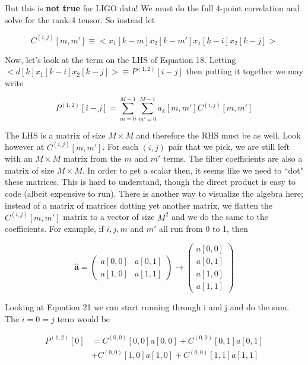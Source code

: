 \documentclass{article}
\begin{document}
But this is \textbf{not true} for LIGO data! We must do the full 4-point correlation
and solve for the rank-4 tensor. So instead let

\begin{equation}
     C^{(i,j)}[m,m'] \equiv \bigg<x_1[k-m]x_2[k-m'] x_1[k-i]x_2[k-j]\bigg> \nonumber
\end{equation}

Now, let's look at the term on the LHS of
Equation 18. Letting $\bigg<d[k]x_1[k-i]x_2[k-j]\bigg> \equiv P^{(1,2)}[i-j]$
then putting it together we may write

\begin{equation}
    P^{(1,2)}[i-j] = \sum_{m=0}^{M-1}\sum_{m'=0}^{M-1}a_k[m,m']
     C^{(i,j)}[m,m']
\end{equation}

The LHS is a matrix of size $M\times M$ and therefore
the RHS must be as well. Look however at $ C^{(i,j)}[m,m']$. For each $(i,j)$
pair that we pick, we are still left with an $M\times M$ matrix from the $m$
and $m'$ terms. The filter coefficients are also a matrix of size $M\times M$.
In order to get a scalar then, it seems like we need to ``dot" these matrices.
This is hard to understand, though the direct product is easy to code (albeit
expensive to run). There is another way to visualize the algebra here; instead
of a matrix of matrices dotting yet another matrix, we flatten the
$C^{(i,j)}[m,m']$ matrix to a vector of size $M^2$ and we do the same to the
coefficients. For example, if $i,j,m$ and $m'$ all run from 0 to 1, then

\begin{equation}
    \hat{\mathbf{a}} = 
    \begin{pmatrix}
        a[0,0] & a[0,1]\\
        a[1,0] & a[1,1]
    \end{pmatrix}
    \to
    \begin{pmatrix}
        a[0,0]\\
        a[0,1]\\
        a[1,0]\\
        a[1,1]
    \end{pmatrix}
\end{equation}

Looking at Equation 21 we can start running through i and j and do the sum. The
$i=0=j$ term would be

\begin{align}
    P^{(1,2)}[0] &= C^{(0,0)}[0,0] a[0,0] + C^{(0,0)}[0,1] a[0,1]\nonumber\\
    &+ C^{(0,0)}[1,0] a[1,0] + C^{(0,0)}[1,1] a[1,1]
\end{align}
\end{document}

